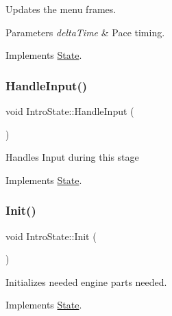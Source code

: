 Updates the menu frames. 


\begin{DoxyParams}{Parameters}
{\em delta\+Time} & Pace timing. \\
\hline
\end{DoxyParams}


Implements \mbox{\hyperlink{classState_ae3bc988c6103665bca68560742fb40e1}{State}}.

\mbox{\label{classIntroState_a6a2a89b3374f53e1bcf366c0ae896109}} 
\subsubsection{\texorpdfstring{Handle\+Input()}{HandleInput()}}
{\footnotesize\ttfamily void Intro\+State\+::\+Handle\+Input (\begin{DoxyParamCaption}{ }\end{DoxyParamCaption})\hspace{0.3cm}{\ttfamily [virtual]}}

Handles Input during this stage 

Implements \mbox{\hyperlink{classState_ad3de659bdeb45c97486464461d625e8f}{State}}.

\mbox{\label{classIntroState_a065e914b336c162b1467845c7126c920}} 
\subsubsection{\texorpdfstring{Init()}{Init()}}
{\footnotesize\ttfamily void Intro\+State\+::\+Init (\begin{DoxyParamCaption}{ }\end{DoxyParamCaption})\hspace{0.3cm}{\ttfamily [virtual]}}

Initializes needed engine parts needed. 

Implements \mbox{\hyperlink{classState_a7ab4d8c6aa239a17ed579d89a209b156}{State}}.

\mbox{\label{classIntroState_a781891b1db3bdbf6af228ef85c0df00a}} 
